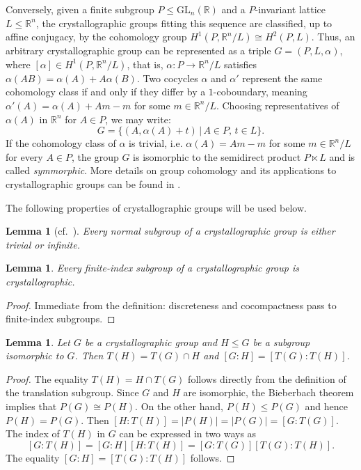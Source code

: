 \documentclass[draft]{adm-paper}
\newtheorem{lemma}[theorem]{Lemma}
\theoremstyle{definition}
\begin{document}
Conversely, given a finite subgroup $P\le \mathrm{GL}_n(\mathbb{R})$ and a $P$-invariant lattice $L\le\mathbb{R}^n$,
the crystallographic groups fitting this sequence are classified, up to affine conjugacy, by the cohomology group
$H^1(P, \mathbb{R}^n / L) \cong H^2(P, L)$. Thus, an arbitrary crystallographic group can be represented as a triple
$G = (P, L, \alpha)$, where $[\alpha] \in H^1(P, \mathbb{R}^n / L)$, that is, $\alpha : P \rightarrow \mathbb{R}^n / L$
satisfies $\alpha(AB) = \alpha(A) + A\alpha(B)$. Two cocycles $\alpha$ and
$\alpha'$ represent the same cohomology class if and only if they differ by a $1$-coboundary, meaning $\alpha'(A) =
\alpha(A) + Am - m$ for some $m \in \mathbb{R}^n / L$. Choosing representatives of $\alpha(A)$ in $\mathbb{R}^n$ for
$A\in P$, we may write:
$$
G = \{ (A, \alpha(A) + t) \,|\, A \in P, \, t \in L \}.
$$
If the cohomology class of $\alpha$ is trivial, i.e. $\alpha(A) = Am - m$ for some $m \in \mathbb{R}^n / L$
for every $A \in P$, the group $G$ is isomorphic to the semidirect product $P \ltimes L$ and is called \textit{symmorphic}.
More details on group cohomology and its applications to crystallographic groups can be found in \cite{Szcz:CrystBook,Brown:Cohomology}.

The following properties of crystallographic groups will be used below.

\begin{lemma}[{cf.\ \cite[Theorem~2]{RatcliffeTschantz2010}}]\label{lemma:norm_cryst}
Every normal subgroup of a crystallographic group is either trivial or infinite.
\end{lemma}

\begin{lemma}\label{lemma:fisubgroup_cryst}
Every finite-index subgroup of a crystallographic group is crystallographic.
\end{lemma}
\begin{proof}
Immediate from the definition: discreteness and cocompactness pass to finite-index subgroups.
\end{proof}

\begin{lemma}\label{lemma:equal_index}
Let $G$ be a crystallographic group and $H\le G$ be a subgroup isomorphic to $G$.
Then $T(H)=T(G)\cap H$ and $[G:H] = [T(G):T(H)]$.
\end{lemma}
\begin{proof}
The equality $T(H)=H\cap T(G)$ follows directly from the definition of the translation subgroup. Since $G$ and $H$ are
isomorphic, the Bieberbach theorem implies that $P(G)\cong P(H)$. On the other hand, $P(H)\le P(G)$ and hence
$P(H)=P(G)$. Then $[H:T(H)]=|P(H)|=|P(G)|=[G:T(G)]$. The index of $T(H)$ in $G$ can be expressed in two ways as
\[
[G:T(H)]=[G:H][H:T(H)]=[G:T(G)][T(G):T(H)].
\]
The equality $[G:H] = [T(G):T(H)]$ follows.
\end{proof}
\end{document}
